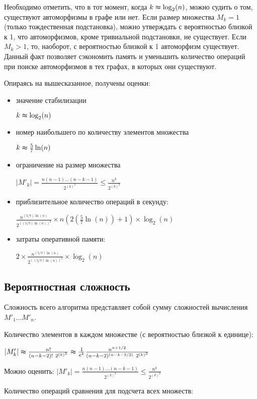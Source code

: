 Необходимо отметить, что в тот момент, когда $k \thickapprox \log _2(n)$, можно судить о том, существуют автоморфизмы в графе или нет. Если размер множества $M_k = 1$ (только тождественная подстановка), можно утверждать с вероятностью близкой к 1, что автоморфизмов, кроме тривиальной подстановки, не существует. Если $M_k > 1$, то, наоборот, с вероятностью близкой к 1 автоморфизм существует. Данный факт позволяет сэкономить память и уменьшить количество операций при поиске автоморфизмов в тех графах, в которых они существуют.

Опираясь на вышесказанное, получены оценки:
\begin{itemize}
\item значение стабилизации 

$k \thickapprox \log _2(n)$
\item номер наибольшего по количеству элементов множества 

$k \thickapprox \frac{5}{7}\ln(n)$
\item ограничение на размер множества 

$|M'_k| = \frac{n(n-1)\ldots(n-k-1)}{2^{(k)^2}} \le \frac{n^{k}}{2^{(k)^2}}$
\item приблизительное количество операций в секунду:

$\frac{n^{(5/7) \ln(n)}}{2^{((5/7)\ln(n))^2}}\times n(2(\frac{5}{7}\ln(n)) + 1)\times \log_2(n)$

\item затраты оперативной памяти: 

$2 \times \frac{n^{(5/7) \ln(n)}}{2^{((5/7)\ln(n))^2}} \times \log_2(n)$
\end{itemize}

\subsection{Вероятностная сложность}

Сложность всего алгоритма представляет собой сумму сложностей вычисления $M'_1 \ldots M'_n$.

Количество элементов в каждом множестве (с вероятностью близкой к единице):

$ |M'_{k}| \thickapprox \frac{n!}{(n-k-2)!~2^{(k)^2}} \thickapprox \frac{1}{e^{k}} \frac{n^{n+1/2}}{(n-k-2)^{(n-k-3/2)}~2^{(k)^2}} $

Можно оценить: $ |M'_k| = \frac{n(n-1)\ldots(n-k-1)}{2^{(k)^2}} \le \frac{n^{k}}{2^{(k)^2}} $

Количество операций сравнения для подсчета всех множеств:

